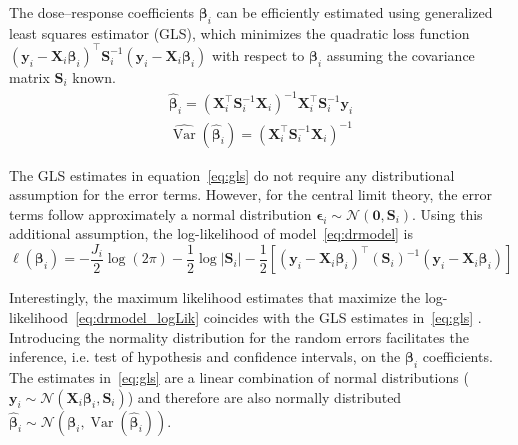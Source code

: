 \documentclass[11pt,a4paper,twoside,openany]{book}\usepackage{knitr}
\DeclareMathOperator{\Var}{Var}
\begin{document}
{The dose--response coefficients $\boldsymbol{\beta}_i$ can be efficiently estimated using generalized least squares estimator (GLS), which minimizes the quadratic loss function $\left(\mathbf{y}_i- \mathbf{X}_i \boldsymbol{\beta}_i \right)^\top \mathbf{S}_i^{-1} \left(\mathbf{y}_i- \mathbf{X}_i \boldsymbol{\beta}_i \right)$ with respect to $\boldsymbol{\beta}_i$ assuming the covariance matrix $\mathbf{S}_i$ known. 
\begin{equation}
\begin{gathered}
\boldsymbol{\hat \beta}_i = ( \mathbf{X}_i^\top  \mathbf{S}_i^{-1} \mathbf{X}_i)^{-1} \mathbf{X}_i^\top  \mathbf{S}_i^{-1} \mathbf{y}_i \\ 
\widehat{\Var} \left( \boldsymbol{\hat \beta}_i \right) = ( \mathbf{X}_i^\top \mathbf{S}_i^{-1} \mathbf{X}_i)^{-1}
\end{gathered}
\label{eq:gls}
\end{equation}

\noindent The GLS estimates in equation~\ref{eq:gls} do not require any distributional assumption for the error terms. However, for the central limit theory, the error terms follow approximately a normal distribution $\boldsymbol{\epsilon}_i \sim \mathcal{N}\left(\mathbf{0}, \mathbf{S}_i \right)$. 
Using this additional assumption, the log-likelihood of model~\ref{eq:drmodel} is
\begin{equation}
\ell\left(\boldsymbol{\beta}_i\right) = -\frac{J_i}{2}\log\left(2\pi\right) - \frac{1}{2}\log|\mathbf{S}_i| - \frac{1}{2} \left[\left(\mathbf{y}_i- \mathbf{X}_i \boldsymbol{\beta}_i \right)^\top \left( \mathbf{S}_i \right)^{-1} \left(\mathbf{y}_i- \mathbf{X}_i \boldsymbol{\beta}_i \right) \right]
\label{eq:drmodel_logLik}
\end{equation}

\noindent Interestingly, the maximum likelihood estimates that maximize the log-likelihood~\ref{eq:drmodel_logLik} coincides with the GLS estimates in~\ref{eq:gls} \citep{orsini2006generalized}. Introducing the normality distribution for the random errors facilitates the inference, i.e. test of hypothesis and confidence intervals, on the $\boldsymbol{\beta}_i$ coefficients. The estimates in~\ref{eq:gls} are a linear combination of normal distributions ($\mathbf{y}_i \sim \mathcal{N}\left(\mathbf{X}_i \boldsymbol{\beta}_i, \mathbf{S}_i \right)$) and therefore are also normally  distributed $\boldsymbol{\hat \beta}_i \sim \mathcal{N}\left( \boldsymbol{\beta}_i, {\Var} \left( \boldsymbol{\hat \beta}_i \right)\right)$.

}
\end{document}
